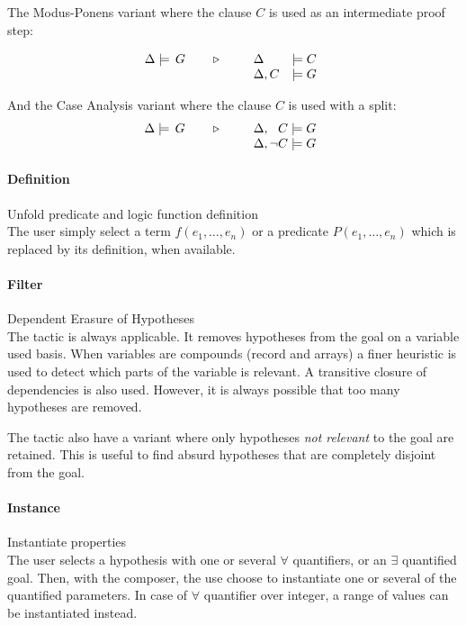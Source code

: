 The \textsf{Modus-Ponens} variant where the clause $C$ is used as an intermediate proof step:

$$\TACTIC{\Delta\models\,G}{%
\begin{array}[t]{ll}
\Delta &\models C \\
\Delta,C &\models G
\end{array}} $$

And the \textsf{Case Analysis} variant where the clause $C$ is used with a split:
$$\TACTIC{\Delta\models\,G}{%
\begin{array}[t]{ll}
\Delta,\phantom{\neg}C \models G \\
\Delta,\neg C \models G
\end{array}} $$

\paragraph{Definition} Unfold predicate and logic function definition\\
The user simply select a term $f(e_1,\ldots,e_n)$ or a predicate $P(e_1,\ldots,e_n)$ which is replaced by its definition, when available.

\paragraph{Filter} Dependent Erasure of Hypotheses \\
The tactic is always applicable. It removes hypotheses from the goal on a
variable used basis. When variables are compounds (record and arrays) a finer
heuristic is used to detect which parts of the variable is relevant. A
transitive closure of dependencies is also used. However, it is always
possible that too many hypotheses are removed.

The tactic also have a variant where only hypotheses \emph{not relevant} to the
goal are retained. This is useful to find absurd hypotheses that are completely
disjoint from the goal.

\paragraph{Instance} Instantiate properties\\
The user selects a hypothesis with one or several $\forall$ quantifiers, or an $\exists$ quantified goal. Then, with the composer, the use choose to instantiate one or several of the quantified parameters. In case of $\forall$ quantifier over integer, a range of values can be instantiated instead.

